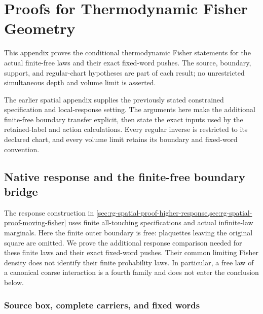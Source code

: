 \begingroup

\chapter{Proofs for Thermodynamic Fisher Geometry}
\label{app:thermodynamic-fisher-draft-proofs}

This appendix proves the conditional thermodynamic Fisher statements for
the actual finite-free laws and their exact fixed-word pushes. The source,
boundary, support, and regular-chart hypotheses are part of each result;
no unrestricted simultaneous depth and volume limit is asserted.

The earlier spatial appendix supplies the previously stated constrained
specification and local-response setting. The arguments here make the
additional finite-free boundary transfer explicit, then state the exact
inputs used by the retained-label and action calculations. Every regular
inverse is restricted to its declared chart, and every volume limit
retains its boundary and fixed-word convention.\thermoestablishedstatus

\section{Native response and the finite-free boundary bridge}
\label{sec:rg-thermo-native-proof}

The response construction in
\cref{sec:rg-spatial-proof-higher-response,sec:rg-spatial-proof-moving-fisher}
uses finite all-touching specifications and actual infinite-law marginals.
Here the finite outer boundary is free: plaquettes leaving the original
square are omitted. We prove the additional response comparison needed for
these finite laws and their exact fixed-word pushes. Their common limiting
Fisher density does not identify their finite probability laws. In
particular, a free law of a canonical coarse interaction is a fourth
family and does not enter the conclusion below.\thermoestablishedstatus


\subsection{Source box, complete carriers, and fixed words}
\label{sec:rg-thermo-native-families}

